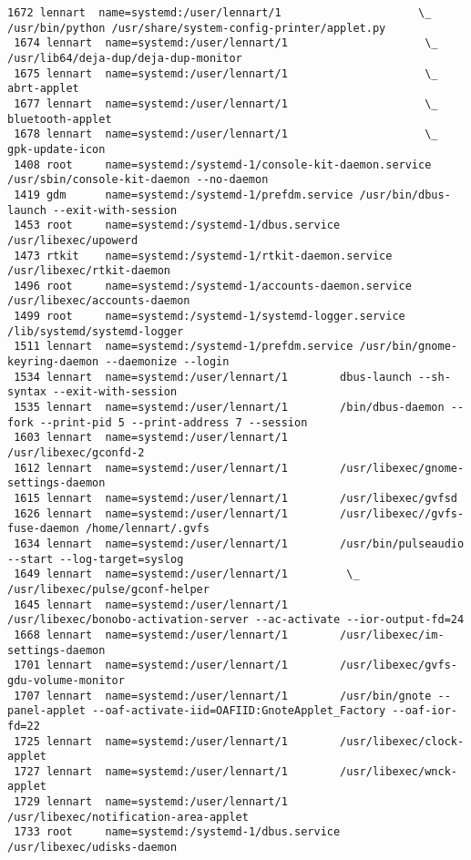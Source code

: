 \documentclass[10pt,oneside,a4paper]{article}
\begin{document}
\begin{landscape}
\begin{Verbatim}[fontsize=\small]
 1672 lennart  name=systemd:/user/lennart/1                     \_ /usr/bin/python /usr/share/system-config-printer/applet.py
 1674 lennart  name=systemd:/user/lennart/1                     \_ /usr/lib64/deja-dup/deja-dup-monitor
 1675 lennart  name=systemd:/user/lennart/1                     \_ abrt-applet
 1677 lennart  name=systemd:/user/lennart/1                     \_ bluetooth-applet
 1678 lennart  name=systemd:/user/lennart/1                     \_ gpk-update-icon
 1408 root     name=systemd:/systemd-1/console-kit-daemon.service /usr/sbin/console-kit-daemon --no-daemon
 1419 gdm      name=systemd:/systemd-1/prefdm.service /usr/bin/dbus-launch --exit-with-session
 1453 root     name=systemd:/systemd-1/dbus.service /usr/libexec/upowerd
 1473 rtkit    name=systemd:/systemd-1/rtkit-daemon.service /usr/libexec/rtkit-daemon
 1496 root     name=systemd:/systemd-1/accounts-daemon.service /usr/libexec/accounts-daemon
 1499 root     name=systemd:/systemd-1/systemd-logger.service /lib/systemd/systemd-logger
 1511 lennart  name=systemd:/systemd-1/prefdm.service /usr/bin/gnome-keyring-daemon --daemonize --login
 1534 lennart  name=systemd:/user/lennart/1        dbus-launch --sh-syntax --exit-with-session
 1535 lennart  name=systemd:/user/lennart/1        /bin/dbus-daemon --fork --print-pid 5 --print-address 7 --session
 1603 lennart  name=systemd:/user/lennart/1        /usr/libexec/gconfd-2
 1612 lennart  name=systemd:/user/lennart/1        /usr/libexec/gnome-settings-daemon
 1615 lennart  name=systemd:/user/lennart/1        /usr/libexec/gvfsd
 1626 lennart  name=systemd:/user/lennart/1        /usr/libexec//gvfs-fuse-daemon /home/lennart/.gvfs
 1634 lennart  name=systemd:/user/lennart/1        /usr/bin/pulseaudio --start --log-target=syslog
 1649 lennart  name=systemd:/user/lennart/1         \_ /usr/libexec/pulse/gconf-helper
 1645 lennart  name=systemd:/user/lennart/1        /usr/libexec/bonobo-activation-server --ac-activate --ior-output-fd=24
 1668 lennart  name=systemd:/user/lennart/1        /usr/libexec/im-settings-daemon
 1701 lennart  name=systemd:/user/lennart/1        /usr/libexec/gvfs-gdu-volume-monitor
 1707 lennart  name=systemd:/user/lennart/1        /usr/bin/gnote --panel-applet --oaf-activate-iid=OAFIID:GnoteApplet_Factory --oaf-ior-fd=22
 1725 lennart  name=systemd:/user/lennart/1        /usr/libexec/clock-applet
 1727 lennart  name=systemd:/user/lennart/1        /usr/libexec/wnck-applet
 1729 lennart  name=systemd:/user/lennart/1        /usr/libexec/notification-area-applet
 1733 root     name=systemd:/systemd-1/dbus.service /usr/libexec/udisks-daemon

\end{Verbatim}
\end{landscape}
\end{document}
